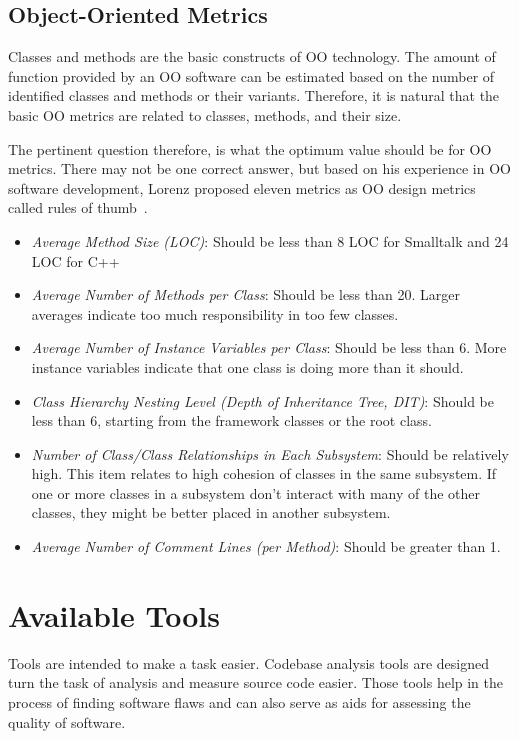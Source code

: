 \subsection{Object-Oriented Metrics}
Classes and methods are the basic constructs of OO technology.
The amount of function provided by an OO software can be estimated based on the number of identified classes and methods or their variants.
Therefore, it is natural that the basic OO metrics are related to classes, methods, and their size.

The pertinent question therefore, is what the optimum value should be for OO metrics. There may not be one correct answer,
but based on his experience in OO software development, Lorenz proposed eleven metrics as OO design metrics called rules of thumb~\cite{lorenz1994object}.
\begin{itemize}
\item \emph{Average Method Size (LOC)}: Should be less than 8 LOC for Smalltalk and 24 LOC for C++
\item \emph{Average Number of Methods per Class}: Should be less than 20. Larger averages indicate too much responsibility in too few classes.
\item \emph{Average Number of Instance Variables per Class}: Should be less than 6. More instance variables indicate that one class is doing more than it should.
\item \emph{Class Hierarchy Nesting Level (Depth of Inheritance Tree, DIT)}: Should be less than 6, starting from the framework classes or the root class.
\item \emph{Number of Class/Class Relationships in Each Subsystem}: Should be relatively high. This item relates to high cohesion of classes in the same subsystem. If one or more classes in a subsystem don't interact with many of the other classes, they might be better placed in another subsystem.
\item \emph{Average Number of Comment Lines (per Method)}: Should be greater than 1.
\end{itemize}




\section{Available Tools}
Tools are intended to make a task easier.
Codebase analysis tools are designed turn the task of analysis and measure source code easier.
Those tools help in the process of finding software flaws and can also serve as aids for assessing the quality of software.


